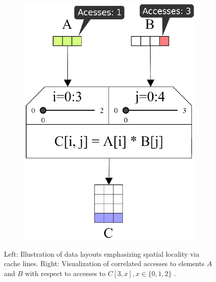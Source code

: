 \begin{figure}
\begin{subfigure}[c]{.44\linewidth}
		\includegraphics[width=\linewidth]{pictures/boosting_access_patterns.png}
	\end{subfigure}
	\caption{Left: Illustration of data layouts emphasizing spatial locality via cache lines. Right: Visualization of correlated accesses to elements $A$ and $B$ with respect to accesses to $C[3,x], x \in \{0,1,2\}$ \cite{schaad2022boosting}.}
	\label{fig:boosting_cache}
\end{figure}

